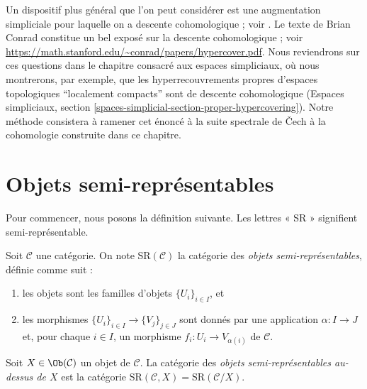 \medskip\noindent
Un dispositif plus général que l'on peut considérer est une augmentation simpliciale pour laquelle
on a descente cohomologique ; voir \cite[Expos\'e Vbis]{SGA4}. Le texte de
Brian Conrad constitue un bel exposé sur la descente cohomologique ; voir
\url{https://math.stanford.edu/~conrad/papers/hypercover.pdf}.
Nous reviendrons sur ces questions dans le chapitre consacré aux espaces simpliciaux,
où nous montrerons, par exemple, que les hyperrecouvrements propres d'espaces
topologiques ``localement compacts'' sont de descente cohomologique
(Espaces simpliciaux, section
\ref{spaces-simplicial-section-proper-hypercovering}).
Notre méthode consistera à ramener cet énoncé à la suite spectrale de {\v C}ech
à la cohomologie construite dans ce chapitre.






























\section{Objets semi-représentables}
\label{section-semi-representable}

\noindent
Pour commencer, nous posons la définition suivante.
Les lettres « SR » signifient semi-représentable.

\begin{definition}
\label{definition-SR}
Soit $\mathcal{C}$ une catégorie. On note $\text{SR}(\mathcal{C})$
la catégorie des {\it objets semi-représentables}, définie comme suit :
\begin{enumerate}
\item les objets sont les familles d'objets $\{U_i\}_{i \in I}$, et
\item les morphismes $\{U_i\}_{i \in I} \to \{V_j\}_{j \in J}$ sont donnés par
une application $\alpha : I \to J$ et, pour chaque $i \in I$,
un morphisme $f_i : U_i \to V_{\alpha(i)}$ de $\mathcal{C}$.
\end{enumerate}
Soit $X \in \Ob(\mathcal{C})$ un objet de $\mathcal{C}$.
La catégorie des {\it objets semi-représentables au-dessus de $X$}
est la catégorie
$\text{SR}(\mathcal{C}, X) = \text{SR}(\mathcal{C}/X)$.
\end{definition}

